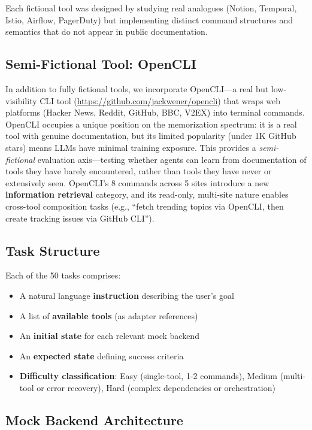 \documentclass{article}
\begin{document}
Each fictional tool was designed by studying real analogues (Notion, Temporal, Istio, Airflow, PagerDuty) but implementing distinct command structures and semantics that do not appear in public documentation.

\subsection{Semi-Fictional Tool: OpenCLI}

In addition to fully fictional tools, we incorporate OpenCLI---a real but low-visibility CLI tool (\url{https://github.com/jackwener/opencli}) that wraps web platforms (Hacker News, Reddit, GitHub, BBC, V2EX) into terminal commands. OpenCLI occupies a unique position on the memorization spectrum: it is a real tool with genuine documentation, but its limited popularity (under 1K GitHub stars) means LLMs have minimal training exposure. This provides a \emph{semi-fictional} evaluation axis---testing whether agents can learn from documentation of tools they have barely encountered, rather than tools they have never or extensively seen. OpenCLI's 8 commands across 5 sites introduce a new \textbf{information retrieval} category, and its read-only, multi-site nature enables cross-tool composition tasks (e.g., ``fetch trending topics via OpenCLI, then create tracking issues via GitHub CLI'').

\subsection{Task Structure}

Each of the 50 tasks comprises:
\begin{itemize}[leftmargin=*, itemsep=1pt]
    \item A natural language \textbf{instruction} describing the user's goal
    \item A list of \textbf{available tools} (as adapter references)
    \item An \textbf{initial state} for each relevant mock backend
    \item An \textbf{expected state} defining success criteria
    \item \textbf{Difficulty classification}: Easy (single-tool, 1-2 commands), Medium (multi-tool or error recovery), Hard (complex dependencies or orchestration)
\end{itemize}

\subsection{Mock Backend Architecture}
\end{document}
